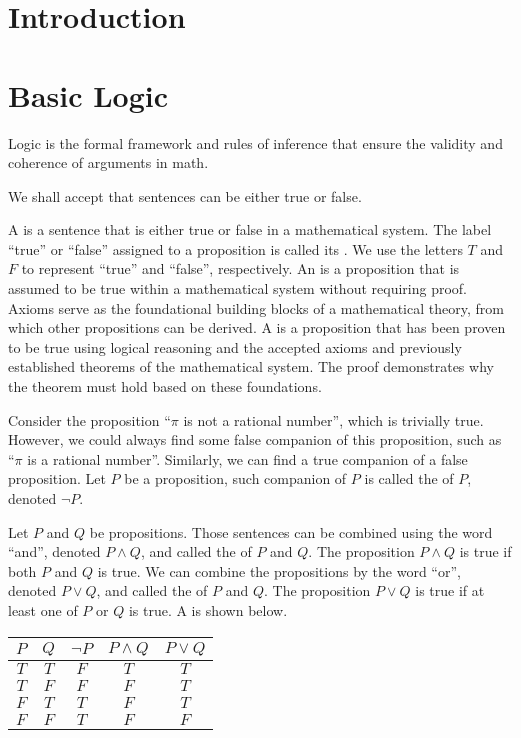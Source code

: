 \documentclass[10pt]{article}
\begin{document}
\def\htitle{An Introduction to Proofs}
\def\hauthor{Hassium, Tingyu Wu}
\hsetup
\htoc
\hmain
\section*{Introduction}





\section{Basic Logic}
Logic is the formal framework and rules of inference that ensure the validity and coherence of arguments in math. 
\begin{remark}
    We shall accept that sentences can be either true or false.
\end{remark} 
\par
A  is a sentence that is either true or false in a mathematical system. The label ``true'' or ``false'' assigned to a proposition is called its . We use the letters $T$ and $F$ to represent ``true'' and ``false'', respectively. An  is a proposition that is assumed to be true within a mathematical system without requiring proof. Axioms serve as the foundational building blocks of a mathematical theory, from which other propositions can be derived. A  is a proposition that has been proven to be true using logical reasoning and the accepted axioms and previously established theorems of the mathematical system. The proof demonstrates why the theorem must hold based on these foundations.
\par
Consider the proposition ``$\pi$ is not a rational number'', which is trivially true. However, we could always find some false companion of this proposition, such as ``$\pi$ is a rational number''. Similarly, we can find a true companion of a false proposition. Let $P$ be a proposition, such companion of $P$ is called the  of $P$, denoted $\neg P$.
\par
Let $P$ and $Q$ be propositions. Those sentences can be combined using the word ``and'', denoted $P\wedge Q$, and called the  of $P$ and $Q$. The proposition $P\wedge Q$ is true if both $P$ and $Q$ is true. We can combine the propositions by the word ``or'', denoted $P\vee Q$, and called the  of $P$ and $Q$. The proposition $P\vee Q$ is true if at least one of $P$ or $Q$ is true. A  is shown below.
\begin{center}
    \begin{tabular}{cc|ccc}
        $P$ & $Q$ & $\neg P$ & $P\wedge Q$ & $P\vee Q$ \\
        \hline
        $T$ & $T$ & $F$ & $T$ & $T$ \\
        $T$ & $F$ & $F$ & $F$ & $T$ \\
        $F$ & $T$ & $T$ & $F$ & $T$ \\
        $F$ & $F$ & $T$ & $F$ & $F$ \\
    \end{tabular}
\end{center}
\end{document}
